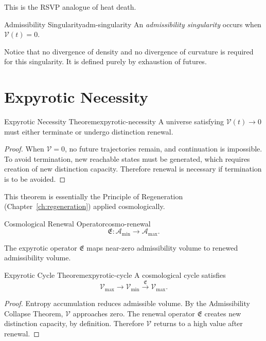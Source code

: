 \documentclass[12pt,twoside,openright]{book}
\begin{document}
This is the RSVP analogue of heat death.

\begin{definition}{Admissibility Singularity}{adm-singularity}
  An \emph{admissibility singularity} occurs when
  $\mathcal{V}(t) = 0$.
\end{definition}

Notice that no divergence of density and no divergence of
curvature is required for this singularity. It is defined
purely by exhaustion of futures.

\section{Expyrotic Necessity}
\label{sec:ch18-necessity}

\begin{theorem}{Expyrotic Necessity Theorem}{expyrotic-necessity}
  A universe satisfying $\mathcal{V}(t) \to 0$ must either
  terminate or undergo distinction renewal.
\end{theorem}

\begin{proof}
  When $\mathcal{V} = 0$, no future trajectories remain, and
  continuation is impossible. To avoid termination, new
  reachable states must be generated, which requires
  creation of new distinction capacity. Therefore renewal
  is necessary if termination is to be avoided.
\end{proof}

This theorem is essentially the Principle of Regeneration
(Chapter~\ref{ch:regeneration}) applied
cosmologically.

\begin{definition}{Cosmological Renewal Operator}{cosmo-renewal}
  \[
    \mathfrak{E} : \mathcal{A}_{\min} \to \mathcal{A}_{\max}.
  \]
\end{definition}

The expyrotic operator $\mathfrak{E}$ maps near-zero
admissibility volume to renewed admissibility volume.

\begin{theorem}{Expyrotic Cycle Theorem}{expyrotic-cycle}
  A cosmological cycle satisfies
  \[
    \mathcal{V}_{\max} \to \mathcal{V}_{\min}
    \xrightarrow{\ \mathfrak{E}\ } \mathcal{V}_{\max}.
  \]
\end{theorem}

\begin{proof}
  Entropy accumulation reduces admissible volume. By the
  Admissibility Collapse Theorem, $\mathcal{V}$ approaches
  zero. The renewal operator $\mathfrak{E}$ creates new
  distinction capacity, by definition. Therefore
  $\mathcal{V}$ returns to a high value after renewal.
\end{proof}
\end{document}
